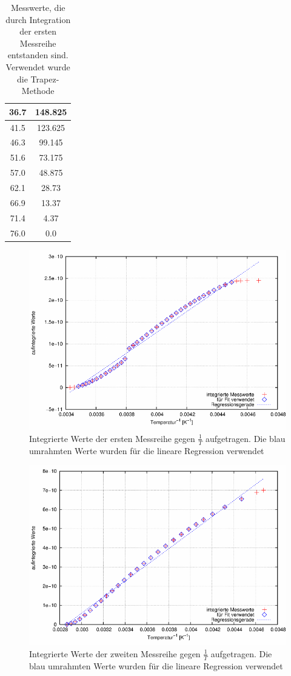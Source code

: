 \begin{table}[htbp]
\begin{minipage}[t]{0.45\textwidth}
\begin{tabular}{c|c}
36.7 &148.825\\\hline
41.5 &123.625\\\hline
46.3 &99.145\\\hline
51.6 &73.175\\\hline
57.0 &48.875\\\hline
62.1 &28.73\\\hline
66.9 &13.37\\\hline
71.4 &4.37\\\hline
76.0 &0.0\\\hline
\end{tabular}
\end{minipage}
\caption{Messwerte, die durch Integration der ersten Messreihe entstanden sind. Verwendet wurde die Trapez-Methode}
\label{tab_int2}
\end{table}

\begin{figure}[H]
\includegraphics[scale=0.8]{../gnu/relax31.pdf}
\caption{Integrierte Werte der ersten Messreihe gegen $\frac{1}{T}$ aufgetragen. Die blau umrahmten Werte wurden für die lineare Regression verwendet}
\label{pic_int1}
\end{figure}
\begin{figure}[H]
\includegraphics[scale=0.8]{../gnu/relax32.pdf}
\caption{Integrierte Werte der zweiten Messreihe gegen $\frac{1}{T}$ aufgetragen. Die blau umrahmten Werte wurden für die lineare Regression verwendet}
\label{pic_int2}
\end{figure}

